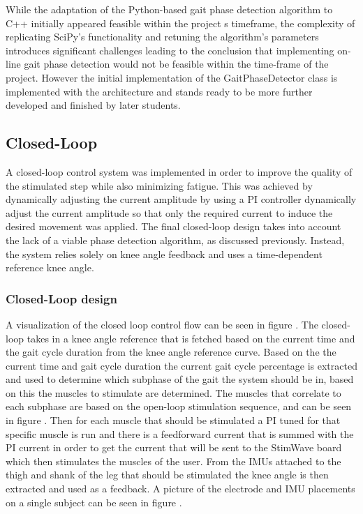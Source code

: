 While the adaptation of the Python-based gait phase detection algorithm to C++ initially appeared feasible within the project
s timeframe, the complexity of replicating SciPy's functionality and retuning the algorithm's parameters introduces significant challenges leading to the conclusion that implementing on-line gait phase detection would not be feasible within the time-frame of the project. However the initial implementation of the GaitPhaseDetector class is implemented with the architecture and stands ready to be more further developed and finished by later students.

\subsection{Closed-Loop}
A closed-loop control system was implemented in order to improve the quality of the stimulated step while also minimizing fatigue. This was achieved by dynamically adjusting the current amplitude by using a  PI controller dynamically adjust the current amplitude so that only the required current to induce the desired movement was applied. The final closed-loop design takes into account the lack of a viable phase detection algorithm, as discussed previously. Instead, the system relies solely on knee angle feedback and uses a time-dependent reference knee angle.

\subsubsection{Closed-Loop design}
A visualization of the closed loop control flow can be seen in figure . The closed-loop takes in a knee angle reference that is fetched based on the current time and the gait cycle duration from the knee angle reference curve. Based on the the current time and gait cycle duration the current gait cycle percentage is extracted and used to determine which subphase of the gait the system should be in, based on this the muscles to stimulate are determined. The muscles that correlate to each subphase are based on the open-loop stimulation sequence, and can be seen in figure . Then for each muscle that should be stimulated a PI tuned for that specific muscle is run and there is a feedforward current that is summed with the PI current in order to get the current that will be sent to the StimWave board which then stimulates the muscles of the user. From the IMUs attached to the thigh and shank of the leg that should be stimulated the knee angle is then extracted and used as a feedback. A picture of the electrode and IMU placements on a single subject can be seen in figure .

